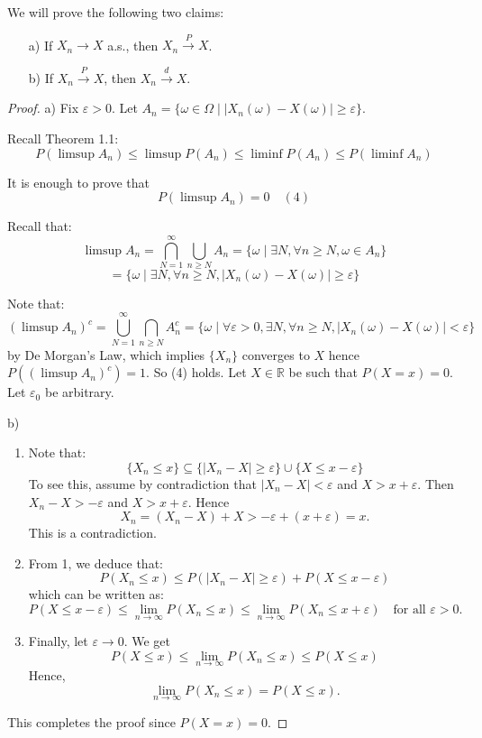 \begin{theorem}[25.2]
We will prove the following two claims:
\begin{enumerate}
    \item[a)] If \( X_n \rightarrow X \) a.s., then \( X_n \xrightarrow{P} X \).
    \item[b)] If \( X_n \xrightarrow{P} X \), then \( X_n \xrightarrow{d} X \).
\end{enumerate}
\end{theorem}
\begin{proof}
    a) Fix \(\varepsilon > 0\). Let \(A_n = \{ \omega \in \Omega \mid |X_n(\omega) - X(\omega)| \geq \varepsilon \}\).

Recall Theorem 1.1:
\[ P(\limsup A_n) \leq \limsup P(A_n) \leq \liminf P(A_n) \leq P(\liminf A_n) \]

It is enough to prove that
\[ P(\limsup A_n) = 0 \quad (4) \]

Recall that:
\[ \limsup A_n = \bigcap_{N=1}^{\infty} \bigcup_{n \geq N} A_n = \{ \omega \mid \exists N, \forall n \geq N, \omega \in A_n \} \]
\[ = \{ \omega \mid \exists N, \forall n \geq N, |X_n(\omega) - X(\omega)| \geq \varepsilon \} \]

Note that:
\[ (\limsup A_n)^c = \bigcup_{N=1}^{\infty} \bigcap_{n \geq N} A_n^c = \{ \omega \mid \forall \varepsilon > 0, \exists N, \forall n \geq N, |X_n(\omega) - X(\omega)| < \varepsilon \} \]
by De Morgan's Law, which implies \(\{X_n\}\) converges to \(X\) hence \(P((\limsup A_n)^c) = 1\). So (4) holds.
Let \( X \in \mathbb{R} \) be such that \( P(X=x) = 0 \). Let \( \varepsilon_0 \) be arbitrary.

b)

\begin{enumerate}
    \item Note that:
    \[ \{X_n \leq x\} \subseteq \{ |X_n - X| \geq \varepsilon \} \cup \{X \leq x-\varepsilon\} \]
    To see this, assume by contradiction that \( |X_n - X| < \varepsilon \) and \( X > x+\varepsilon \).
    Then \( X_n - X > -\varepsilon \) and \( X > x+\varepsilon \). Hence
    \[ X_n = (X_n - X) + X > -\varepsilon + (x + \varepsilon) = x. \]
    This is a contradiction.

    \item From 1, we deduce that:
    \[ P(X_n \leq x) \leq P(|X_n - X| \geq \varepsilon) + P(X \leq x-\varepsilon) \]
    which can be written as:
    \[ P(X \leq x-\varepsilon) \leq \lim_{n \to \infty} P(X_n \leq x) \leq \lim_{n \to \infty} P(X_n \leq x+\varepsilon) \quad \text{for all } \varepsilon > 0. \]

    \item Finally, let \( \varepsilon \to 0 \). We get
    \[ P(X \leq x) \leq \lim_{n \to \infty} P(X_n \leq x) \leq P(X \leq x) \]
    Hence,
    \[ \lim_{n \to \infty} P(X_n \leq x) = P(X \leq x). \]
\end{enumerate}
This completes the proof since \( P(X=x) = 0 \).
\end{proof}


